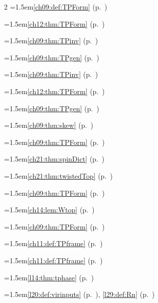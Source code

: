 \begin{multicols}{2}
\hangindent=1.5em\quad \ref{ch09:def:TPForm} (p.~\pageref{ch09:def:TPForm})\par
\hangindent=1.5em\quad \ref{ch12:thm:TPForm} (p.~\pageref{ch12:thm:TPForm})\par
\hangindent=1.5em\quad \ref{ch09:thm:TPinv} (p.~\pageref{ch09:thm:TPinv})\par
\hangindent=1.5em\quad \ref{ch09:thm:TPgen} (p.~\pageref{ch09:thm:TPgen})\par
\hangindent=1.5em\quad \ref{ch09:thm:TPinv} (p.~\pageref{ch09:thm:TPinv})\par
\hangindent=1.5em\quad \ref{ch12:thm:TPForm} (p.~\pageref{ch12:thm:TPForm})\par
\hangindent=1.5em\quad \ref{ch09:thm:TPgen} (p.~\pageref{ch09:thm:TPgen})\par
\hangindent=1.5em\quad \ref{ch09:thm:skew} (p.~\pageref{ch09:thm:skew})\par
\hangindent=1.5em\quad \ref{ch09:thm:TPForm} (p.~\pageref{ch09:thm:TPForm})\par
\hangindent=1.5em\quad \ref{ch21:thm:spinDict} (p.~\pageref{ch21:thm:spinDict})\par
\hangindent=1.5em\quad \ref{ch21:thm:twistedTop} (p.~\pageref{ch21:thm:twistedTop})\par
\hangindent=1.5em\quad \ref{ch09:thm:TPForm} (p.~\pageref{ch09:thm:TPForm})\par
\hangindent=1.5em\quad \ref{ch14:lem:Wtop} (p.~\pageref{ch14:lem:Wtop})\par
\hangindent=1.5em\quad \ref{ch09:thm:TPForm} (p.~\pageref{ch09:thm:TPForm})\par
\hangindent=1.5em\quad \ref{ch11:def:TPframe} (p.~\pageref{ch11:def:TPframe})\par
\hangindent=1.5em\quad \ref{ch11:def:TPframe} (p.~\pageref{ch11:def:TPframe})\par
\hangindent=1.5em\quad \ref{l14:thm:tphase} (p.~\pageref{l14:thm:tphase})\par
\hangindent=1.5em\quad \ref{l20:def:virinputs} (p.~\pageref{l20:def:virinputs}), \ref{l29:def:Rn} (p.~\pageref{l29:def:Rn})\par

\end{multicols}

